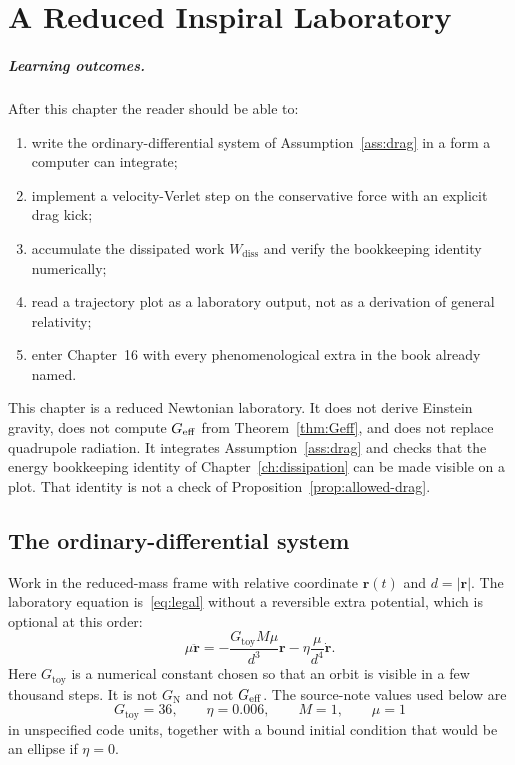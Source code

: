 \chapter[Inspiral laboratory]{A Reduced Inspiral Laboratory}
\label{ch:numerics}

\paragraph{Learning outcomes.}
After this chapter the reader should be able to:
\begin{enumerate}
  \item write the ordinary-differential system of
        Assumption~\ref{ass:drag} in a form a computer can
        integrate;
  \item implement a velocity-Verlet step on the conservative force
        with an explicit drag kick;
  \item accumulate the dissipated work \(W_{\mathrm{diss}}\) and
        verify the bookkeeping identity numerically;
  \item read a trajectory plot as a laboratory output, not as a
        derivation of general relativity;
  \item enter Chapter~16 with every phenomenological extra in the
        book already named.
\end{enumerate}

This chapter is a reduced Newtonian laboratory. It does not derive
Einstein gravity, does not compute \(G_{\mathrm{eff}}\) from
Theorem~\ref{thm:Geff}, and does not replace quadrupole radiation.
It integrates Assumption~\ref{ass:drag} and checks that the energy
bookkeeping identity of Chapter~\ref{ch:dissipation} can be made
visible on a plot. That identity is not a check of
Proposition~\ref{prop:allowed-drag}.

\section{The ordinary-differential system}
\label{sec:ch15-ode}

Work in the reduced-mass frame with relative coordinate
\(\mathbf{r}(t)\) and \(d=|\mathbf{r}|\). The laboratory equation
is~\eqref{eq:legal} without a reversible extra potential, which
is optional at this order:
\begin{equation}
  \label{eq:lab-ode}
  \mu\ddot{\mathbf{r}}
  =-\frac{G_{\mathrm{toy}}M\mu}{d^{3}}\mathbf{r}
   -\eta\frac{\mu}{d^{4}}\dot{\mathbf{r}}.
\end{equation}
Here \(G_{\mathrm{toy}}\) is a numerical constant chosen so that
an orbit is visible in a few thousand steps. It is not
\(G_{\mathrm{N}}\) and not \(G_{\mathrm{eff}}\). The source-note values used
below are
\begin{equation}
  \label{eq:toy-params}
  G_{\mathrm{toy}}=36,\qquad
  \eta=0.006,\qquad
  M=1,\qquad
  \mu=1
\end{equation}
in unspecified code units, together with a bound initial condition
that would be an ellipse if \(\eta=0\).

